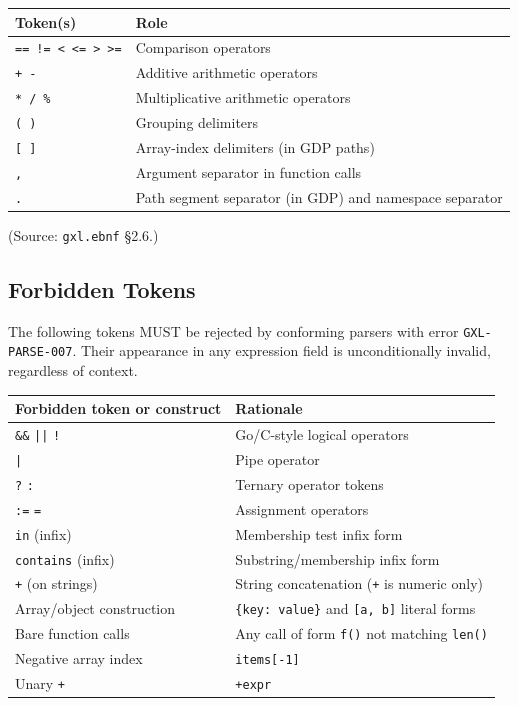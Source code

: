 \begin{center}
\begin{tabular}{ll}
\hline
\textbf{Token(s)} & \textbf{Role} \\
\hline
\texttt{==}~\texttt{!=}~\texttt{<}~\texttt{<=}~\texttt{>}~\texttt{>=}
  & Comparison operators \\
\texttt{+}~\texttt{-} & Additive arithmetic operators \\
\texttt{*}~\texttt{/}~\texttt{\%} & Multiplicative arithmetic operators \\
\texttt{(}~\texttt{)} & Grouping delimiters \\
\texttt{[}~\texttt{]} & Array-index delimiters (in GDP paths) \\
\texttt{,}          & Argument separator in function calls \\
\texttt{.}          & Path segment separator (in GDP) and namespace separator \\
\hline
\end{tabular}
\end{center}

(Source: \texttt{gxl.ebnf} \S2.6.)

\subsection{Forbidden Tokens}
\label{subsec:gxl:forbidden-tokens}

The following tokens MUST be rejected by conforming parsers with error
\texttt{GXL-PARSE-007}.
Their appearance in any expression field is unconditionally invalid,
regardless of context.

\begin{center}
\begin{tabular}{ll}
\hline
\textbf{Forbidden token or construct} & \textbf{Rationale} \\
\hline
\texttt{\&\&} \texttt{||} \texttt{!} & Go/C-style logical operators \\
\texttt{|} & Pipe operator \\
\texttt{?} \texttt{:} & Ternary operator tokens \\
\texttt{:=} \texttt{=} & Assignment operators \\
\texttt{in} (infix) & Membership test infix form \\
\texttt{contains} (infix) & Substring/membership infix form \\
\texttt{+} (on strings) & String concatenation (\texttt{+} is numeric only) \\
Array/object construction & \texttt{\{key:~value\}} and \texttt{[a,~b]} literal forms \\
Bare function calls & Any call of form \texttt{f()} not matching \texttt{len()} \\
Negative array index & \texttt{items[-1]} \\
Unary \texttt{+} & \texttt{+expr} \\
\hline
\end{tabular}
\end{center}

